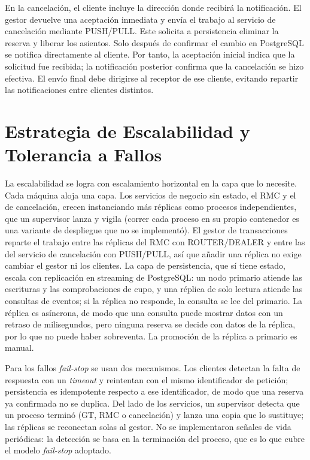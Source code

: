 \documentclass[10pt, a4paper]{article}
\begin{document}
    En la cancelación, el cliente incluye la dirección donde recibirá la notificación. El gestor devuelve una aceptación inmediata y envía el trabajo al servicio de cancelación mediante PUSH/PULL. Este solicita a persistencia eliminar la reserva y liberar los asientos. Solo después de confirmar el cambio en PostgreSQL se notifica directamente al cliente. Por tanto, la aceptación inicial indica que la solicitud fue recibida; la notificación posterior confirma que la cancelación se hizo efectiva. El envío final debe dirigirse al receptor de ese cliente, evitando repartir las notificaciones entre clientes distintos.
	
	\section{Estrategia de Escalabilidad y Tolerancia a Fallos}
	\label{sec:scalability}
	La escalabilidad se logra con escalamiento horizontal en la capa que lo necesite. Cada máquina aloja una capa. Los servicios de negocio sin estado, el RMC y el de cancelación, crecen instanciando más réplicas como procesos independientes, que un supervisor lanza y vigila (correr cada proceso en su propio contenedor es una variante de despliegue que no se implementó). El gestor de transacciones reparte el trabajo entre las réplicas del RMC con ROUTER/DEALER y entre las del servicio de cancelación con PUSH/PULL, así que añadir una réplica no exige cambiar el gestor ni los clientes. La capa de persistencia, que sí tiene estado, escala con replicación en streaming de PostgreSQL: un nodo primario atiende las escrituras y las comprobaciones de cupo, y una réplica de solo lectura atiende las consultas de eventos; si la réplica no responde, la consulta se lee del primario. La réplica es asíncrona, de modo que una consulta puede mostrar datos con un retraso de milisegundos, pero ninguna reserva se decide con datos de la réplica, por lo que no puede haber sobreventa. La promoción de la réplica a primario es manual.
	
	Para los fallos \textit{fail-stop} se usan dos mecanismos. Los clientes detectan la falta de respuesta con un \textit{timeout} y reintentan con el mismo identificador de petición; persistencia es idempotente respecto a ese identificador, de modo que una reserva ya confirmada no se duplica. Del lado de los servicios, un supervisor detecta que un proceso terminó (GT, RMC o cancelación) y lanza una copia que lo sustituye; las réplicas se reconectan solas al gestor. No se implementaron señales de vida periódicas: la detección se basa en la terminación del proceso, que es lo que cubre el modelo \textit{fail-stop} adoptado.
\end{document}
